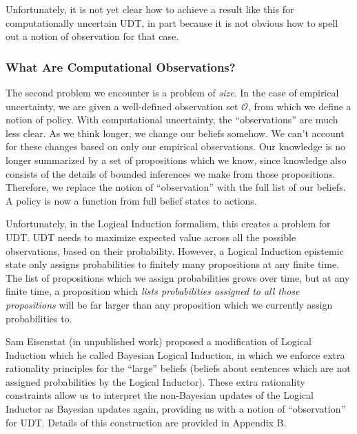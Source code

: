 \documentclass{article}
\begin{document}
Unfortunately, it is not yet clear how to achieve a result like this for computationally uncertain UDT, in part because it is not obvious how to spell out a notion of observation for that case. 

\subsubsection{What Are Computational Observations?}

The second problem we encounter is a problem of \emph{size}. In the case of empirical uncertainty, we are given a well-defined observation set $\mathcal{O}$, from which we define a notion of policy. With computational uncertainty, the ``observations'' are much less clear. As we think longer, we change our beliefs somehow. We can't account for these changes based on only our empirical observations. Our knowledge is no longer summarized by a set of propositions which we know, since knowledge also consists of the details of bounded inferences we make from those propositions. Therefore, we replace the notion of ``observation'' with the full list of our beliefs. A policy is now a function from full belief states to actions.

Unfortunately, in the Logical Induction formalism, this creates a problem for UDT. UDT needs to maximize expected value across all the possible observations, based on their probability. However, a Logical Induction epistemic state only assigns probabilities to finitely many propositions at any finite time. The list of propositions which we assign probabilities grows over time, but at any finite time, a proposition which \emph{lists probabilities assigned to all those propositions} will be far larger than any proposition which we currently assign probabilities to. 

Sam Eisenstat (in unpublished work) proposed a modification of Logical Induction which he called Bayesian Logical Induction, in which we enforce extra rationality principles for the ``large'' beliefs (beliefs about sentences which are not assigned probabilities by the Logical Inductor). These extra rationality constraints allow us to interpret the non-Bayesian updates of the Logical Inductor as Bayesian updates again, providing us with a notion of ``observation'' for UDT. Details of this construction are provided in Appendix B.
\end{document}
